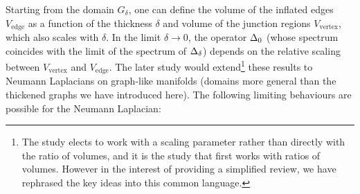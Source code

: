 Starting from the domain $G_{\delta}$, one can define the volume of the inflated edges $V_{\mathrm{edge}}$ as a function of the thickness $\delta$ and volume of the junction regions $V_{\mathrm{vertex}}$, which also scales with $\delta$.
In the limit $\delta\rightarrow0$, the operator $\Delta_0$ (whose spectrum coincides with the limit of the spectrum of $\Delta_\delta$) depends on the relative scaling between $V_{\mathrm{vertex}}$ and $V_{\mathrm{edge}}$.
The later study \cite{exner2005convergence} would extend\footnote{The study \cite{kuchment2003asymptotics} elects to work with a scaling parameter rather than directly with the ratio of volumes, and it is the study \cite{exner2005convergence} that first works with ratios of volumes. However in the interest of providing a simplified review, we have rephrased the key ideas into this common language.} these results to Neumann Laplacians on graph-like manifolds (domains more general than the thickened graphs we have introduced here).
The following limiting behaviours are possible for the Neumann Laplacian:
